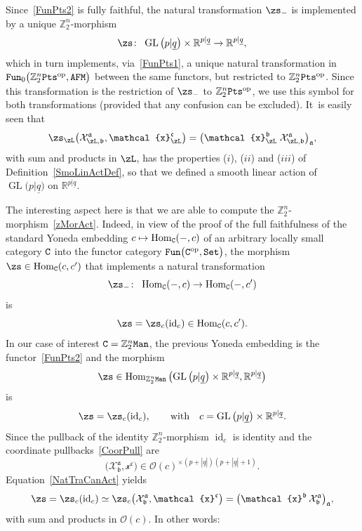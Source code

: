 \documentclass[10pt,a4paper]{amsart}
\newcommand{\op}[1]{\operatorname{#1}}
\newcommand{\R}{{\mathbb R}}
\newcommand{\Z}{{\mathbb Z}}
\def\ul{\underline}
\def\cO{\mathcal{O}}
\def\ul{\underline}
\newcommand{\0}{\otimes}
\newcommand{\id}{\op{id}}
\newcommand{\z}{\Z_2^n}
\numberwithin{equation}{section}
\begin{document}
Since~\eqref{FunPts2} is fully faithful, the natural transformation $\zs_-$ is implemented by a unique $\z$-morphism
\begin{gather}\label{zMorAct}
\zs\colon\ \op{GL}\big(p|\ul q\big)\times\R^{p|\ul q}\to\R^{p|\ul q},
\end{gather}
which in turn implements, via~\eqref{FunPts1}, a unique natural transformation in ${\tt Fun}_0\big(\z{\tt Pts}^{\op{op}},{\tt AFM}\big)$ between the same functors, but restricted to $\z{\tt Pts}^{\op{op}}$. Since this transformation is the restriction of $\zs _-$ to $\z{\tt Pts}^{\op{op}}$, we use this symbol for both transformations (provided that any confusion can be excluded). It~is easily seen that
\[
\zs_\zL\big(\mathcal{X}^{\mathfrak{a}}_{\zL,\mathfrak{b}},\mathcal{x}_\zL^{\mathfrak{c}}\big) =\big(\mathcal{x}_\zL^{\mathfrak{b}}\;\mathcal{X}^{\mathfrak{a}}_{\zL,\mathfrak{b}}\big)_\mathfrak{a},
\]
with sum and products in $\zL$, has the properties ($i$), ($ii$) and ($iii$) of Definition~\ref{SmoLinActDef}, so that we defined a smooth linear action of $\op{GL}\big(p|\ul q\big)$ on $\R^{p|\ul q}$.

The interesting aspect here is that we are able to compute the $\z$-morphism~\eqref{zMorAct}. Indeed, in view of the proof of the full faithfulness of the standard Yoneda embedding $c\mapsto \op{Hom}_{\tt C}(-,c)$ of an arbitrary locally small category $\tt C$ into the functor category ${\tt Fun}\big({\tt C}^{\op{op}},{\tt Set}\big)$, the morphism $\zs\in\op{Hom}_{\tt C}(c,c')$ that implements a natural transformation
\[
\zs_-\colon\ \op{Hom}_{\tt C}(-,c)\to \op{Hom}_{\tt C}(-,c')
\]
is
\[
\zs=\zs_c(\id_c)\in\op{Hom}_{\tt C}(c,c').
\]
In our case of interest ${\tt C}=\z{\tt Man}$, the previous Yoneda embedding is the functor~\eqref{FunPts2} and the morphism
\[
\zs\in\op{Hom}_{\z\tt Man}\big(\!\op{GL}\big(p|\ul q\big)\times\R^{p|\ul q},\R^{p|\ul q}\big)
\]
is
\[
\zs=\zs_c(\id_c),\qquad\text{with}\quad c=\op{GL}\big(p|\ul q\big)\times\R^{p|\ul q}.
\]
Since the pullback of the identity $\z$-morphism $\id_c$ is identity and the coordinate pullbacks~\eqref{CoorPull} are
\[
\big(\mathcal{X}^{\mathfrak{a}}_{\mathfrak{b}},\mathcal{x}^{\mathfrak{c}}\big)\in\cO(c)^{\times(p+|\ul q|)(p+|\ul q|+1)}.
\]
Equation~\eqref{NatTraCanAct} yields
\[
\zs=\zs_c(\id_c)\simeq\zs_c\big(\mathcal{X}^{\mathfrak{a}}_{\mathfrak{b}},\mathcal{x}^{\mathfrak{c}}\big) =\big(\mathcal{x}^{\mathfrak{b}}\,\mathcal{X}^{\mathfrak{a}}_{\mathfrak{b}}\big)_{\mathfrak{a}},
\]
with sum and products in $\cO(c)$. In other words:
\end{document}
